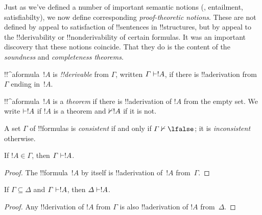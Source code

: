 \documentclass[../../../include/open-logic-section]{subfiles}
\begin{document}
      {}
      {}


\begin{explain}
Just as we've defined a number of important semantic notions
(, entailment, satisfiabilty), we now
define corresponding \emph{proof-theoretic notions}.  These are not
defined by appeal to satisfaction of !!{sentence}s in !!{structure}s,
but by appeal to the !!{derivability} or !!{nonderivability} of
certain formulas.  It was an important discovery that these notions
coincide.  That they do is the content of the \emph{soundness} and
\emph{completeness theorems}.
\end{explain}

\begin{defn}[!!^{derivability}]
!!^a{formula}~$!A$ is \emph{!!{derivable}} from $\Gamma$, written
$\Gamma \Proves !A$, if there is !!a{derivation} from~$\Gamma$ ending
in~$!A$.
\end{defn}

\begin{defn}[Theorems]
!!^a{formula}~$!A$ is a \emph{theorem} if there is !!a{derivation} of
$!A$ from the empty set.  We write $\Proves !A$ if $!A$ is a theorem
and $\Proves/ !A$ if it is not.
\end{defn}

\begin{defn}[Consistency]
A set $\Gamma$ of !!{formula}s is \emph{consistent} if and only if
$\Gamma\Proves/ \lfalse$; it is \emph{inconsistent} otherwise.
\end{defn}

\begin{prop}[Reflexivity]
If $!A \in \Gamma$, then $\Gamma \Proves !A$.
\end{prop}

\begin{proof}
  The !!{formula}~$!A$ by itself is !!a{derivation} of~$!A$ from~$\Gamma$.
\end{proof}

\begin{prop}[Monotonicity]
If $\Gamma \subseteq \Delta$ and $\Gamma \Proves !A$, then $\Delta
\Proves !A$.
\end{prop}

\begin{proof}
Any !!{derivation} of $!A$ from $\Gamma$ is also !!a{derivation} of
$!A$ from~$\Delta$.
\end{proof}
\end{document}
